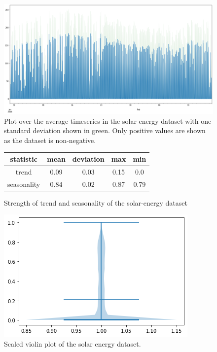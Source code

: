 \begin{figure}[htb]
    \centering
    \includegraphics[width=\linewidth]{./img/solar-energy_plot.png}
    \caption{Plot over the average timeseries in the solar energy dataset with one standard deviation shown in green. Only positive values are shown as the dataset is non-negative.}
    \label{fig:solar-energy_plot}
    \endminipage\hfill
\end{figure}

\begin{figure}[htb]
    \centering
    \begin{center}
        \begin{tabular}{||c | c | c | c | c |}
            \hline
            statistic   & mean & deviation & max  & min  \\
            \hline
            trend       & 0.09 & 0.03      & 0.15 & 0.0  \\
            \hline
            seasonality & 0.84 & 0.02      & 0.87 & 0.79 \\
            \hline
            \hline
        \end{tabular}
        \caption{Strength of trend and seasonality of the solar-energy dataset}
    \end{center}
    \endminipage\hfill
    \includegraphics[width=\linewidth]{./img/solar-energy_violin.png}
    \caption{Scaled violin plot of the solar energy dataset.}
    \label{fig:solar-energy_violin}
    \endminipage\hfill
\end{figure}


